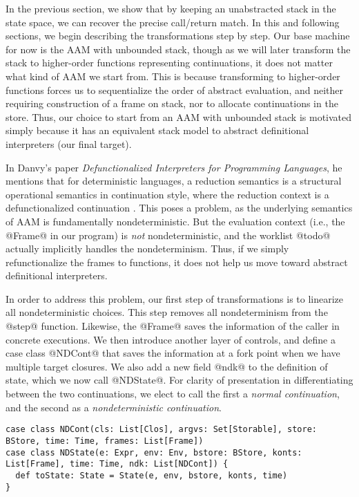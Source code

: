 \documentclass[acmsmall,review,anonymous]{acmart}\settopmatter{printfolios=true,printccs=false,printacmref=false}
\begin{document}
In the previous section, we show that by keeping an unabstracted stack in the state
space, we can recover the precise call/return match.
In this and following sections, we begin describing the transformations step by step.
Our base machine for now is the AAM with unbounded stack, though
as we will later transform the stack to higher-order functions
representing continuations, it does not matter what kind of AAM we start from.
This is because transforming to higher-order functions forces us to sequentialize
the order of abstract evaluation, and neither requiring construction of a frame on stack, 
nor to allocate continuations in the store.
Thus, our choice to start from an AAM with unbounded stack is motivated simply because 
it has an equivalent stack model to abstract definitional interpreters (our final target).

In Danvy's paper \textit{Defunctionalized Interpreters for Programming
  Languages}, he mentions that for deterministic languages, a reduction semantics
is a structural operational semantics in continuation style, where the reduction
context is a defunctionalized continuation \cite{Danvy:2008:DIP:1411204.1411206}.
This poses a problem, as the underlying semantics of AAM is fundamentally nondeterministic.
But the evaluation context (i.e., the @Frame@ in our program) is \emph{not}
nondeterministic, and the worklist @todo@ actually implicitly handles the nondeterminism.
Thus, if we simply refunctionalize the frames to functions, it does not help us move toward
abstract definitional interpreters.

In order to address this problem, our first step of transformations
is to linearize all nondeterministic choices.
This step removes all nondeterminism from the @step@ function.
Likewise, the @Frame@ saves the information of the caller in concrete executions.
We then introduce another layer of controls, and define a case class @NDCont@
that saves the information at a fork point when we have multiple target closures.
We also add a new field @ndk@ to the definition of state, which we now call @NDState@.
For clarity of presentation in differentiating between the two continuations, we elect to call
the first a \emph{normal continuation}, and the second as a \emph{nondeterministic
continuation}.

\begin{lstlisting}
case class NDCont(cls: List[Clos], argvs: Set[Storable], store: BStore, time: Time, frames: List[Frame])
case class NDState(e: Expr, env: Env, bstore: BStore, konts: List[Frame], time: Time, ndk: List[NDCont]) {
  def toState: State = State(e, env, bstore, konts, time)
}
\end{lstlisting}
\end{document}
